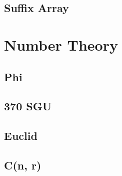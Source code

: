 \documentclass[a4paper,landscape]{article}
\begin{document}
\begin{multicols}{2}
\subsection{Suffix Array}
	

\section{Number Theory}
\subsection{Phi}
	
\subsection{370 SGU}
	
\subsection{Euclid}
	
\subsection{C(n, r)}
	

\end{multicols}
\end{document}
